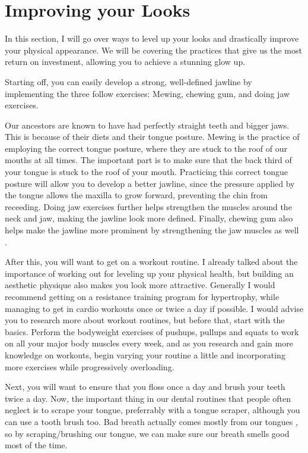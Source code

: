 \documentclass[
]{book}
\begin{document}
\hypertarget{improving-your-looks}{%
\chapter{Improving your Looks}\label{improving-your-looks}}

In this section, I will go over ways to level up your looks and drastically improve your physical appearance. We will be covering the practices that give us the most return on investment, allowing you to achieve a stunning glow up.

Starting off, you can easily develop a strong, well-defined jawline by implementing the three follow exercises: Mewing, chewing gum, and doing jaw exercises.

Our ancestors are known to have had perfectly straight teeth and bigger jaws. This is because of their diets and their tongue posture. Mewing is the practice of employing the correct tongue posture, where they are stuck to the roof of our mouths at all times. The important part is to make sure that the back third of your tongue is stuck to the roof of your mouth. Practicing this correct tongue posture will allow you to develop a better jawline, since the pressure applied by the tongue allows the maxilla to grow forward, preventing the chin from receeding. Doing jaw exercises further helps strengthen the muscles around the neck and jaw, making the jawline look more defined. Finally, chewing gum also helps make the jawline more prominent by strengthening the jaw muscles as well \citep{gum}.

After this, you will want to get on a workout routine. I already talked about the importance of working out for leveling up your physical health, but building an aesthetic physique also makes you look more attractive. Generally I would recommend getting on a resistance training program for hypertrophy, while managing to get in cardio workouts once or twice a day if possible. I would advise you to research more about workout routines, but before that, start with the basics. Perform the bodyweight exercises of pushups, pullups and squats to work on all your major body muscles every week, and as you research and gain more knowledge on workouts, begin varying your routine a little and incorporating more exercises while progressively overloading.

Next, you will want to ensure that you floss once a day and brush your teeth twice a day. Now, the important thing in our dental routines that people often neglect is to scrape your tongue, preferrably with a tongue scraper, although you can use a tooth brush too. Bad breath actually comes mostly from our tongues \citep{breath}, so by scraping/brushing our tongue, we can make sure our breath smells good most of the time.
\end{document}
